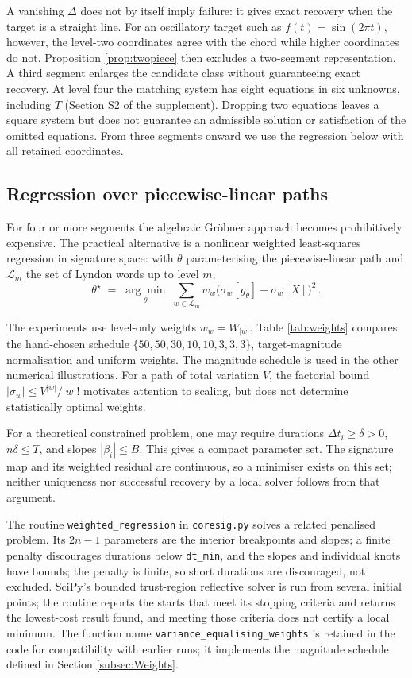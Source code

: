 \documentclass[11pt,english]{article}
\theoremstyle{definition}
\theoremstyle{remark}
\begin{document}
A vanishing $\Delta$ does not by itself imply failure: it gives exact
recovery when the target is a straight line. For an oscillatory target
such as $f(t)=\sin(2\pi t)$, however, the level-two coordinates agree
with the chord while higher coordinates do not. Proposition
\ref{prop:twopiece} then excludes a two-segment representation. A
third segment enlarges the candidate class without guaranteeing exact
recovery. At level four the matching system has eight equations in
six unknowns, including $T$ (Section S2 of the supplement). Dropping two equations
leaves a square system but does not guarantee an admissible solution
or satisfaction of the omitted equations. From three segments onward
we use the regression below with all retained coordinates.

\subsection{Regression over piecewise-linear paths\label{subsec:Regression}}

For four or more segments the algebraic Gröbner approach becomes prohibitively
expensive. The practical alternative is a nonlinear weighted least-squares
regression in signature space: with $\theta$ parameterising the piecewise-linear
path and $\mathcal{L}_{m}$ the set of Lyndon words up to level $m$,
\begin{equation}
\theta^{\star}\;=\;\underset{\theta}{\arg\min}\;\sum_{w\in\mathcal{L}_{m}}w_{w}\bigl(\sigma_{w}[g_{\theta}]-\sigma_{w}[X]\bigr)^{2}\,.\label{eq:weighted-regression}
\end{equation}

The experiments use level-only weights $w_w=W_{|w|}$. Table
\ref{tab:weights} compares the hand-chosen schedule
$\{50,50,30,10,10,3,3,3\}$, target-magnitude normalisation and
uniform weights. The magnitude schedule is used in the other
numerical illustrations. For a path of total variation $V$, the
factorial bound $|\sigma_w|\le V^{|w|}/|w|!$ motivates attention
to scaling, but does not determine statistically optimal weights.

For a theoretical constrained problem, one may require durations
$\Delta t_i\ge\delta>0$, $n\delta\le T$, and slopes
$|\beta_i|\le B$. This gives a compact parameter set. The signature
map and its weighted residual are continuous, so a minimiser exists
on this set; neither uniqueness nor successful recovery by a local
solver follows from that argument.

The routine \texttt{weighted\_regression} in \texttt{coresig.py} solves
a related penalised problem. Its
$2n-1$ parameters are the interior breakpoints and slopes; a finite
penalty discourages durations below \texttt{dt\_min}, and the slopes
and individual knots have bounds; the penalty is finite, so short
durations are discouraged, not excluded. SciPy's bounded trust-region
reflective solver is run from several initial points; the routine
reports the starts that meet its stopping criteria and returns the
lowest-cost result found, and meeting those criteria does not certify
a local minimum. The function name
\texttt{variance\_equalising\_weights} is retained in the code for
compatibility with earlier runs; it implements the
magnitude schedule defined in Section \ref{subsec:Weights}.
\end{document}
